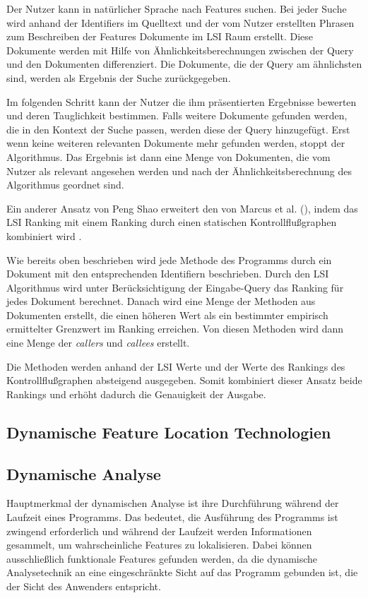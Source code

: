 \documentclass[runningheads,a4paper]{llncs}
\begin{document}
Der Nutzer kann in natürlicher Sprache nach Features suchen. Bei jeder Suche wird anhand der Identifiers im Quelltext und der vom Nutzer erstellten Phrasen zum Beschreiben der Features Dokumente im LSI Raum erstellt. Diese Dokumente werden mit Hilfe von Ähnlichkeitsberechnungen zwischen der Query und den Dokumenten differenziert. Die Dokumente, die der Query am ähnlichsten sind, werden als Ergebnis der Suche zurückgegeben.

Im folgenden Schritt kann der Nutzer die ihm präsentierten Ergebnisse bewerten und deren Tauglichkeit bestimmen. Falls weitere Dokumente gefunden werden, die in den Kontext der Suche passen, werden diese der Query hinzugefügt. Erst wenn keine weiteren relevanten Dokumente mehr gefunden werden, stoppt der Algorithmus. Das Ergebnis ist dann eine Menge von Dokumenten, die vom Nutzer als relevant angesehen werden und nach der Ähnlichkeitsberechnung des Algorithmus geordnet sind.

Ein anderer Ansatz von Peng Shao erweitert den von Marcus et al. (\cite{marcus1}\cite{marcus2}), indem das LSI Ranking mit einem Ranking durch einen statischen Kontrollflußgraphen kombiniert wird \cite{shao}.

Wie bereits oben beschrieben wird jede Methode des Programms durch ein Dokument mit den entsprechenden Identifiern beschrieben. Durch den LSI Algorithmus wird unter Berücksichtigung der Eingabe-Query das Ranking für jedes Dokument berechnet. Danach wird eine Menge der Methoden aus Dokumenten erstellt, die einen höheren Wert als ein bestimmter empirisch ermittelter Grenzwert im Ranking erreichen. Von diesen Methoden wird dann eine Menge der \textit{callers} und \textit{callees} erstellt.

Die Methoden werden anhand der LSI Werte und der Werte des Rankings des Kontrollflußgraphen absteigend ausgegeben. Somit kombiniert dieser Ansatz beide Rankings und erhöht dadurch die Genauigkeit der Ausgabe.

\subsection{Dynamische Feature Location Technologien}

\subsection*{Dynamische Analyse}

Hauptmerkmal der dynamischen Analyse ist ihre Durchführung während der Laufzeit eines Programms. Das bedeutet, die Ausführung des Programms ist zwingend erforderlich und während der Laufzeit werden Informationen gesammelt, um wahrscheinliche Features zu lokalisieren. Dabei können ausschließlich funktionale Features gefunden werden, da die dynamische Analysetechnik an eine eingeschränkte Sicht auf das Programm gebunden ist, die der Sicht des Anwenders entspricht. 
\end{document}

